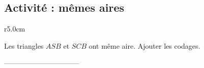 
\subsection{Activité : mêmes aires}

\begin{wrapfigure}[1]{r}{5.0cm}
   \vspace{-0.5cm}        %
   \centering
   
\end{wrapfigure}

Les triangles \( ASB\) et \( SCB\) ont même aire. Ajouter les codages.

\vspace{3cm}
--------------------------------
